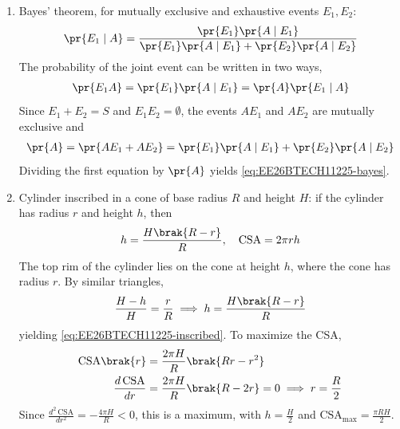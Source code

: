 \begin{enumerate}[label=\thesubsection.\arabic*, ref=\thesubsection.\theenumi]
\item Bayes' theorem, for mutually exclusive and exhaustive events $E_1, E_2$:
\begin{align}
	\pr{E_1 \mid A} = \frac{\pr{E_1}\pr{A \mid E_1}}{\pr{E_1}\pr{A \mid E_1} + \pr{E_2}\pr{A \mid E_2}}
	\label{eq:EE26BTECH11225-bayes}
\end{align}
\solution
The probability of the joint event can be written in two ways,
\begin{align}
	\pr{E_1 A} = \pr{E_1}\pr{A \mid E_1} = \pr{A}\pr{E_1 \mid A}
\end{align}
Since $E_1 + E_2 = S$ and $E_1E_2 = \emptyset$, the events $AE_1$ and $AE_2$ are mutually exclusive and
\begin{align}
	\pr{A} = \pr{AE_1 + AE_2} = \pr{E_1}\pr{A \mid E_1} + \pr{E_2}\pr{A \mid E_2}
\end{align}
Dividing the first equation by $\pr{A}$ yields \eqref{eq:EE26BTECH11225-bayes}.

\item Cylinder inscribed in a cone of base radius $R$ and height $H$: if the cylinder has radius $r$ and height $h$, then
\begin{align}
	h = \frac{H\brak{R - r}}{R}, \quad \text{CSA} = 2\pi r h
	\label{eq:EE26BTECH11225-inscribed}
\end{align}
\solution
The top rim of the cylinder lies on the cone at height $h$, where the cone has radius $r$. By similar triangles,
\begin{align}
	\frac{H - h}{H} = \frac{r}{R}
	\implies h = \frac{H\brak{R - r}}{R}
\end{align}
yielding \eqref{eq:EE26BTECH11225-inscribed}. To maximize the CSA,
\begin{align}
	\text{CSA}\brak{r} &= \frac{2\pi H}{R}\brak{Rr - r^2}
	\label{eq:EE26BTECH11225-inscribed-max}
	\\
	\frac{d\,\text{CSA}}{dr} &= \frac{2\pi H}{R}\brak{R - 2r} = 0 \implies r = \frac{R}{2}
\end{align}
Since $\frac{d^2\,\text{CSA}}{dr^2} = -\frac{4\pi H}{R} < 0$, this is a maximum, with $h = \frac{H}{2}$ and $\text{CSA}_{\max} = \frac{\pi R H}{2}$.

\end{enumerate}
